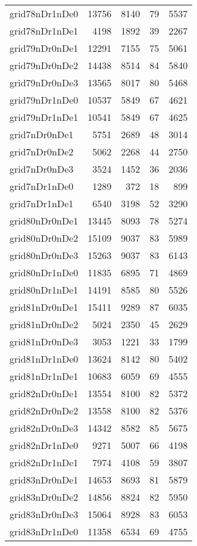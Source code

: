 \begin{longtable}{lrrrr}
grid78nDr1nDe0 & 13756 & 8140 & 79 & 5537 \\
grid78nDr1nDe1 & 4198 & 1892 & 39 & 2267 \\
grid79nDr0nDe1 & 12291 & 7155 & 75 & 5061 \\
grid79nDr0nDe2 & 14438 & 8514 & 84 & 5840 \\
grid79nDr0nDe3 & 13565 & 8017 & 80 & 5468 \\
grid79nDr1nDe0 & 10537 & 5849 & 67 & 4621 \\
grid79nDr1nDe1 & 10541 & 5849 & 67 & 4625 \\
grid7nDr0nDe1 & 5751 & 2689 & 48 & 3014 \\
grid7nDr0nDe2 & 5062 & 2268 & 44 & 2750 \\
grid7nDr0nDe3 & 3524 & 1452 & 36 & 2036 \\
grid7nDr1nDe0 & 1289 & 372 & 18 & 899 \\
grid7nDr1nDe1 & 6540 & 3198 & 52 & 3290 \\
grid80nDr0nDe1 & 13445 & 8093 & 78 & 5274 \\
grid80nDr0nDe2 & 15109 & 9037 & 83 & 5989 \\
grid80nDr0nDe3 & 15263 & 9037 & 83 & 6143 \\
grid80nDr1nDe0 & 11835 & 6895 & 71 & 4869 \\
grid80nDr1nDe1 & 14191 & 8585 & 80 & 5526 \\
grid81nDr0nDe1 & 15411 & 9289 & 87 & 6035 \\
grid81nDr0nDe2 & 5024 & 2350 & 45 & 2629 \\
grid81nDr0nDe3 & 3053 & 1221 & 33 & 1799 \\
grid81nDr1nDe0 & 13624 & 8142 & 80 & 5402 \\
grid81nDr1nDe1 & 10683 & 6059 & 69 & 4555 \\
grid82nDr0nDe1 & 13554 & 8100 & 82 & 5372 \\
grid82nDr0nDe2 & 13558 & 8100 & 82 & 5376 \\
grid82nDr0nDe3 & 14342 & 8582 & 85 & 5675 \\
grid82nDr1nDe0 & 9271 & 5007 & 66 & 4198 \\
grid82nDr1nDe1 & 7974 & 4108 & 59 & 3807 \\
grid83nDr0nDe1 & 14653 & 8693 & 81 & 5879 \\
grid83nDr0nDe2 & 14856 & 8824 & 82 & 5950 \\
grid83nDr0nDe3 & 15064 & 8928 & 83 & 6053 \\
grid83nDr1nDe0 & 11358 & 6534 & 69 & 4755 \\

\end{longtable}
